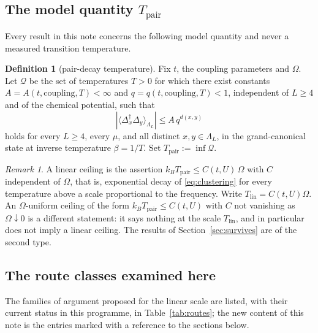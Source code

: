 \documentclass[11pt]{article}
\theoremstyle{definition}
\newtheorem{definition}[theorem]{Definition}
\theoremstyle{remark}
\newtheorem{remark}[theorem]{Remark}
\newcommand{\pair}{\mathrm{pair}}
\newcommand{\Tpair}{T_{\pair}}
\newcommand{\Tlin}{T_{\mathrm{lin}}}
\begin{document}
\subsection{The model quantity \texorpdfstring{$\Tpair$}{T\_pair}}

Every result in this note concerns the following model quantity and never a measured
transition temperature.

\begin{definition}[pair-decay temperature]
\label{def:tpair}
Fix $t$, the coupling parameters and $\Omega$. Let $\mathcal{Q}$ be the set of
temperatures $T>0$ for which there exist constants $A=A(t,\text{coupling},T)<\infty$
and $q=q(t,\text{coupling},T)<1$, independent of $L\ge4$ and of the chemical
potential, such that
\begin{equation}
\left|\langle\Delta_x^\dagger\Delta_y\rangle_{\Lambda_L}\right|\le A\,q^{d(x,y)}
\label{eq:clustering}
\end{equation}
holds for every $L\ge4$, every $\mu$, and all distinct $x,y\in\Lambda_L$, in the
grand-canonical state at inverse temperature $\beta=1/T$. Set
$\Tpair:=\inf\mathcal{Q}$.
\end{definition}

\begin{remark}
A linear ceiling is the assertion $k_B\Tpair\le C(t,U)\,\Omega$ with $C$ independent
of $\Omega$, that is, exponential decay of \eqref{eq:clustering} for every temperature
above a scale proportional to the frequency. Write $\Tlin=C(t,U)\Omega$. An
$\Omega$-uniform ceiling of the form $k_B\Tpair\le C(t,U)$ with $C$ not vanishing as
$\Omega\downarrow0$ is a different statement: it says nothing at the scale $\Tlin$,
and in particular does not imply a linear ceiling. The results of
Section~\ref{sec:survives} are of the second type.
\end{remark}

\subsection{The route classes examined here}

The families of argument proposed for the linear scale are listed, with their current
status in this programme, in Table~\ref{tab:routes}; the new content of this note is
the entries marked with a reference to the sections below.
\end{document}
